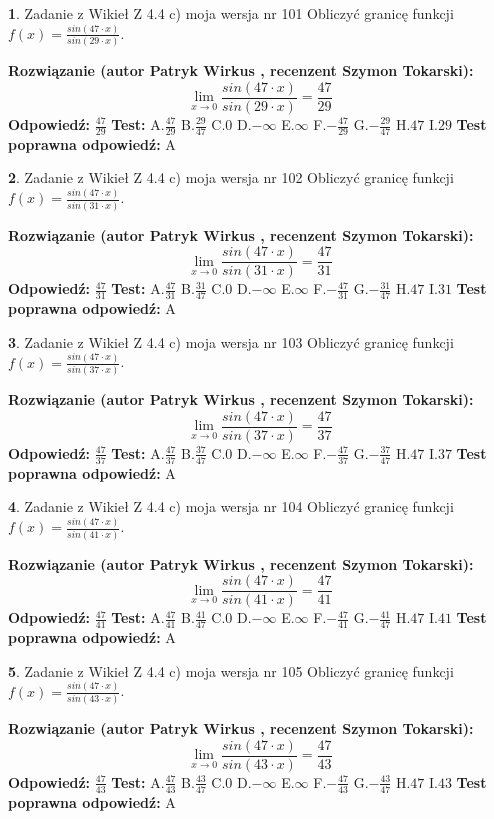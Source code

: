 \documentclass[12pt, a4paper]{article}
\theoremstyle{definition} %
\newtheorem{zad}{}
\newcommand{\zadStart}[1]{\begin{zad}#1\newline}
\newcommand{\zadStop}{\end{zad}}
\newcommand{\rozwStart}[2]{\noindent \textbf{Rozwiązanie (autor #1 , recenzent #2): }\newline}
\newcommand{\rozwStop}{\newline}
\newcommand{\odpStart}{\noindent \textbf{Odpowiedź:}\newline}
\newcommand{\odpStop}{\newline}
\newcommand{\testStart}{\noindent \textbf{Test:}\newline}
\newcommand{\testStop}{\newline}
\newcommand{\kluczStart}{\noindent \textbf{Test poprawna odpowiedź:}\newline}
\newcommand{\kluczStop}{\newline}
\begin{document}
\zadStart{Zadanie z Wikieł Z 4.4 c) moja wersja nr 101}
Obliczyć granicę funkcji $f(x)=\frac{sin(47\cdot x)}{sin(29\cdot x)}$.
\zadStop
\rozwStart{Patryk Wirkus}{Szymon Tokarski}
$$\lim\limits_{x\to 0}\frac{sin(47\cdot x)}{sin(29\cdot x)}=
\frac{47}{29}$$
\rozwStop
\odpStart
$\frac{47}{29}$
\odpStop
\testStart
A.$\frac{47}{29}$
B.$\frac{29}{47}$
C.$0$
D.$-\infty$
E.$\infty$
F.$-\frac{47}{29}$
G.$-\frac{29}{47}$
H.$47$
I.$29$
\testStop
\kluczStart
A
\kluczStop



\zadStart{Zadanie z Wikieł Z 4.4 c) moja wersja nr 102}
Obliczyć granicę funkcji $f(x)=\frac{sin(47\cdot x)}{sin(31\cdot x)}$.
\zadStop
\rozwStart{Patryk Wirkus}{Szymon Tokarski}
$$\lim\limits_{x\to 0}\frac{sin(47\cdot x)}{sin(31\cdot x)}=
\frac{47}{31}$$
\rozwStop
\odpStart
$\frac{47}{31}$
\odpStop
\testStart
A.$\frac{47}{31}$
B.$\frac{31}{47}$
C.$0$
D.$-\infty$
E.$\infty$
F.$-\frac{47}{31}$
G.$-\frac{31}{47}$
H.$47$
I.$31$
\testStop
\kluczStart
A
\kluczStop



\zadStart{Zadanie z Wikieł Z 4.4 c) moja wersja nr 103}
Obliczyć granicę funkcji $f(x)=\frac{sin(47\cdot x)}{sin(37\cdot x)}$.
\zadStop
\rozwStart{Patryk Wirkus}{Szymon Tokarski}
$$\lim\limits_{x\to 0}\frac{sin(47\cdot x)}{sin(37\cdot x)}=
\frac{47}{37}$$
\rozwStop
\odpStart
$\frac{47}{37}$
\odpStop
\testStart
A.$\frac{47}{37}$
B.$\frac{37}{47}$
C.$0$
D.$-\infty$
E.$\infty$
F.$-\frac{47}{37}$
G.$-\frac{37}{47}$
H.$47$
I.$37$
\testStop
\kluczStart
A
\kluczStop



\zadStart{Zadanie z Wikieł Z 4.4 c) moja wersja nr 104}
Obliczyć granicę funkcji $f(x)=\frac{sin(47\cdot x)}{sin(41\cdot x)}$.
\zadStop
\rozwStart{Patryk Wirkus}{Szymon Tokarski}
$$\lim\limits_{x\to 0}\frac{sin(47\cdot x)}{sin(41\cdot x)}=
\frac{47}{41}$$
\rozwStop
\odpStart
$\frac{47}{41}$
\odpStop
\testStart
A.$\frac{47}{41}$
B.$\frac{41}{47}$
C.$0$
D.$-\infty$
E.$\infty$
F.$-\frac{47}{41}$
G.$-\frac{41}{47}$
H.$47$
I.$41$
\testStop
\kluczStart
A
\kluczStop



\zadStart{Zadanie z Wikieł Z 4.4 c) moja wersja nr 105}
Obliczyć granicę funkcji $f(x)=\frac{sin(47\cdot x)}{sin(43\cdot x)}$.
\zadStop
\rozwStart{Patryk Wirkus}{Szymon Tokarski}
$$\lim\limits_{x\to 0}\frac{sin(47\cdot x)}{sin(43\cdot x)}=
\frac{47}{43}$$
\rozwStop
\odpStart
$\frac{47}{43}$
\odpStop
\testStart
A.$\frac{47}{43}$
B.$\frac{43}{47}$
C.$0$
D.$-\infty$
E.$\infty$
F.$-\frac{47}{43}$
G.$-\frac{43}{47}$
H.$47$
I.$43$
\testStop
\kluczStart
A
\kluczStop
\end{document}
